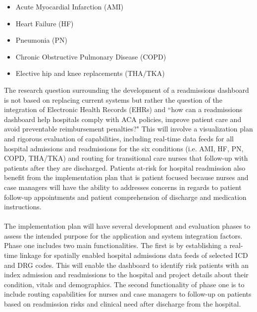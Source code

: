 \documentclass[11pt]{article}\usepackage[]{graphicx}\usepackage[]{color}
\begin{document}
\begin{itemize}

\item	Acute Myocardial Infarction (AMI) 
\item Heart Failure (HF)  
\item Pneumonia (PN)
\item Chronic Obstructive Pulmonary Disease (COPD)
\item Elective hip and knee replacements (THA/TKA)
\end{itemize}

The  research question surrounding the development of a readmissions dashboard is not based on replacing current systems but rather the question of the integration of Electronic Health Records (EHRs) and ``how can a readmissions dashboard help hospitals comply with ACA policies, improve patient care and avoid preventable reimbursement penalties?" This will involve a visualization plan and rigorous evaluation of capabilities, including real-time data feeds for all hospital admissions and readmissions for the six conditions (i.e. AMI, HF, PN, COPD, THA/TKA) and routing for transitional care nurses that follow-up with patients after they are discharged. Patients at-risk for hospital readmission also benefit from the implementation plan that is patient focused because nurses and case managers will have the ability to addresses concerns in regards to patient follow-up appointments and patient comprehension of discharge and medication instructions.
\paragraph{}
The implementation plan will have several development and evaluation phases to assess the intended purpose for the application and system integration factors. Phase one includes two main functionalities. The first is by establishing a real-time linkage for spatially enabled hospital admissions data feeds of selected ICD and DRG codes. This will enable the dashboard to identify risk patients with an index admission and readmissions to the hospital and project details about their condition, vitals and demographics. The second functionality of phase one is to include routing capabilities for nurses and case managers to follow-up on patients based on readmission risks and clinical need after discharge from the hospital. 
\end{document}
